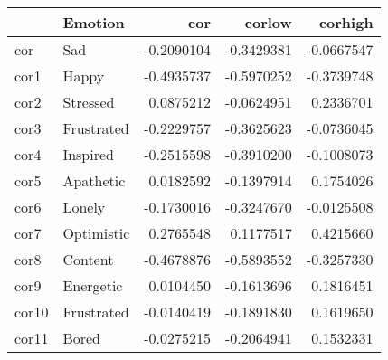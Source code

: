 
\begin{tabular}{l|l|r|r|r}
\hline
  & Emotion & cor & corlow & corhigh\\
\hline
cor & Sad & -0.2090104 & -0.3429381 & -0.0667547\\
\hline
cor1 & Happy & -0.4935737 & -0.5970252 & -0.3739748\\
\hline
cor2 & Stressed & 0.0875212 & -0.0624951 & 0.2336701\\
\hline
cor3 & Frustrated & -0.2229757 & -0.3625623 & -0.0736045\\
\hline
cor4 & Inspired & -0.2515598 & -0.3910200 & -0.1008073\\
\hline
cor5 & Apathetic & 0.0182592 & -0.1397914 & 0.1754026\\
\hline
cor6 & Lonely & -0.1730016 & -0.3247670 & -0.0125508\\
\hline
cor7 & Optimistic & 0.2765548 & 0.1177517 & 0.4215660\\
\hline
cor8 & Content & -0.4678876 & -0.5893552 & -0.3257330\\
\hline
cor9 & Energetic & 0.0104450 & -0.1613696 & 0.1816451\\
\hline
cor10 & Frustrated & -0.0140419 & -0.1891830 & 0.1619650\\
\hline
cor11 & Bored & -0.0275215 & -0.2064941 & 0.1532331\\
\hline
\end{tabular}
